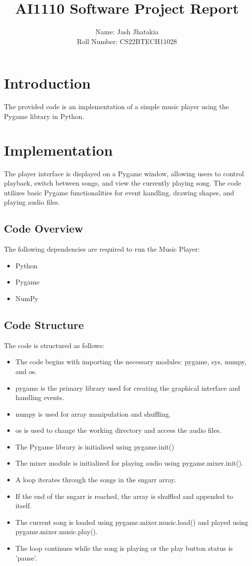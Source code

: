 \documentclass[journal,12pt,twocolumn]{IEEEtran}
\begin{document}
\title{AI1110 Software Project Report}
\author{Name: Jash Jhatakia\\
        Roll Number: CS22BTECH11028}

\maketitle

\section{Introduction}
The provided code is an implementation of a simple music player using the Pygame library in Python.
\section{Implementation}
The player interface is displayed on a Pygame window, allowing users to control playback, switch between songs, and view the currently playing song. The code utilizes basic Pygame functionalities for event handling, drawing shapes, and playing audio files.

\subsection{Code Overview}
The following dependencies are required to run the Music Player:
\begin{itemize}
\item Python
\item Pygame
\item NumPy
\end{itemize}

\subsection{Code Structure}
The code is structured as follows:

\begin{itemize}
\item The code begins with importing the necessary modules: pygame, sys, numpy, and os.
\item pygame is the primary library used for creating the graphical interface and handling events.
\item numpy is used for array manipulation and shuffling.
\item os is used to change the working directory and access the audio files.
\item The Pygame library is initialised using pygame.init()
\item The mixer module is initialized for playing audio using pygame.mixer.init().
\item A loop iterates through the songs in the sngarr array.
\item If the end of the sngarr is reached, the array is shuffled and appended to itself.
\item The current song is loaded using pygame.mixer.music.load() and played using pygame.mixer.music.play().
\item The loop continues while the song is playing or the play button status is 'pause'.

\end{itemize}
\end{document}
